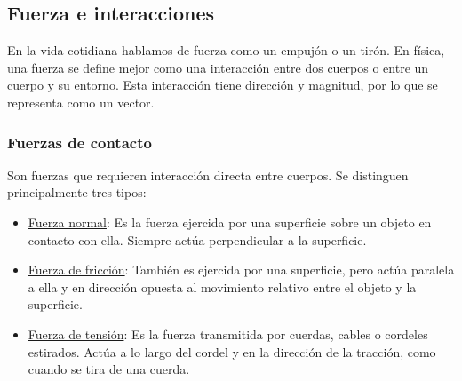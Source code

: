 \documentclass{article}
\newcommand{\newsubsection}[1]{
    \vspace{0.5cm}
    \color{sectionColor}
    \subsection{ #1}
    \color{black}
    \vspace{0.5cm}
}
\newcommand{\newtitle}[1]{
    \color{titleColor}
    \subsubsection{\textbf{#1}}
    \color{black}
}
\begin{document}

    \newsubsection{Fuerza e interacciones}

        \par En la vida cotidiana hablamos de fuerza como un empujón o un tirón. En física, una fuerza se define mejor como una interacción entre dos cuerpos o entre un cuerpo y su entorno. Esta interacción tiene dirección y magnitud, por lo que se representa como un vector.

    \newtitle{Fuerzas de contacto}

        \par Son fuerzas que requieren interacción directa entre cuerpos. Se distinguen principalmente tres tipos:

        \begin{itemize}
            \item \underline{Fuerza normal}: Es la fuerza ejercida por una superficie sobre un objeto en contacto con ella. Siempre actúa perpendicular a la superficie.
            \item \underline{Fuerza de fricción}: También es ejercida por una superficie, pero actúa paralela a ella y en dirección opuesta al movimiento relativo entre el objeto y la superficie.
            \item \underline{Fuerza de tensión}: Es la fuerza transmitida por cuerdas, cables o cordeles estirados. Actúa a lo largo del cordel y en la dirección de la tracción, como cuando se tira de una cuerda.
        \end{itemize}
\end{document}
